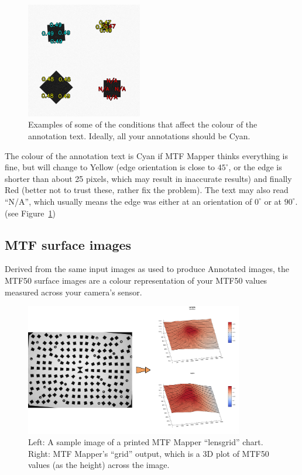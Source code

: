 \documentclass[a4paper]{article}
\begin{document}
\begin{figure}[!ht]
\centering
\includegraphics[width=0.45\textwidth]{figures/annotation_colours}
\caption{Examples of some of the conditions that affect the colour of the
annotation text. Ideally, all your annotations should be Cyan.}
\label{fig:annotated_colours}
\end{figure}

The colour of the annotation text is Cyan if MTF Mapper thinks everything is
fine, but will change to Yellow (edge orientation is close to $45^\circ$, or the edge is
shorter than about 25 pixels, which may result in inaccurate results) and
finally Red (better not to trust these, rather fix the problem). The text
may also read ``N/A'', which usually means the edge was either at an
orientation of $0^\circ$ or at $90^\circ$. (see
Figure~\ref{fig:annotated_colours})

\newpage

\subsection{MTF surface images}
Derived from the same input images as used to produce \textsf{Annotated
images}, the MTF50 surface images are a colour representation of your MTF50
values measured across your camera's sensor.

\begin{figure}[!ht]
\centering
\includegraphics[width=0.85\textwidth]{figures/surface_example}
\caption{Left: A sample image of a printed MTF Mapper ``lensgrid'' chart.
Right: MTF Mapper's ``grid'' output, which is a 3D plot of MTF50 values (as
the height) across the image.
}
\label{fig:surface_example}
\end{figure}
\end{document}
